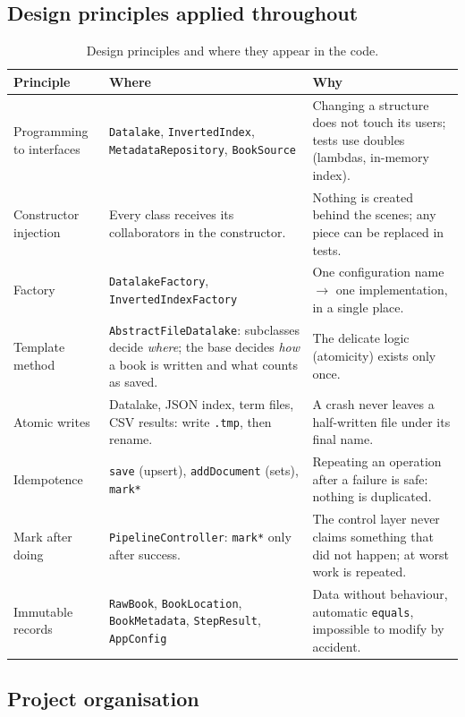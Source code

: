 \documentclass[11pt,a4paper]{article}
\newcommand{\code}[1]{\texttt{#1}}
\begin{document}
\subsection{Design principles applied throughout}
\begin{table}[H]
\centering\small
\begin{tabularx}{\linewidth}{@{}p{3.1cm} Y Y@{}}
\toprule
Principle & Where & Why \\
\midrule
Programming to interfaces & \code{Datalake}, \code{InvertedIndex}, \code{MetadataRepository}, \code{BookSource} & Changing a structure does not touch its users; tests use doubles (lambdas, in-memory index). \\
Constructor injection & Every class receives its collaborators in the constructor. & Nothing is created behind the scenes; any piece can be replaced in tests. \\
Factory & \code{DatalakeFactory}, \code{InvertedIndexFactory} & One configuration name $\rightarrow$ one implementation, in a single place. \\
Template method & \code{AbstractFileDatalake}: subclasses decide \emph{where}; the base decides \emph{how} a book is written and what counts as saved. & The delicate logic (atomicity) exists only once. \\
Atomic writes & Datalake, JSON index, term files, CSV results: write \code{.tmp}, then rename. & A crash never leaves a half-written file under its final name. \\
Idempotence & \code{save} (upsert), \code{addDocument} (sets), \code{mark*} & Repeating an operation after a failure is safe: nothing is duplicated. \\
Mark after doing & \code{PipelineController}: \code{mark*} only after success. & The control layer never claims something that did not happen; at worst work is repeated. \\
Immutable records & \code{RawBook}, \code{BookLocation}, \code{BookMetadata}, \code{StepResult}, \code{AppConfig} & Data without behaviour, automatic \code{equals}, impossible to modify by accident. \\
\bottomrule
\end{tabularx}
\caption{Design principles and where they appear in the code.}
\end{table}

\subsection{Project organisation}
\end{document}
